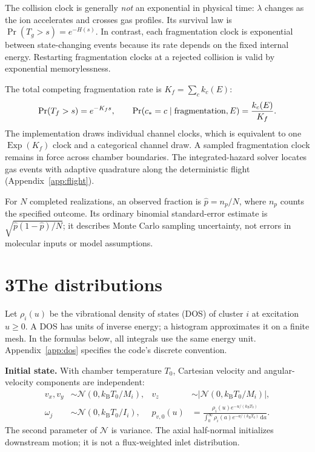 \documentclass[10pt,a4paper]{article}
\newcommand{\dd}{\,\mathrm d}
\newcommand{\kb}{k_{\mathrm B}}
\newcommand{\Normal}{\mathcal N}
\newcommand{\Exp}{\operatorname{Exp}}
\newcommand{\overview}[2]{\section*{#1\quad #2}\addcontentsline{toc}{section}{#1 #2}}
\begin{document}
The collision clock is generally \emph{not} an exponential in physical time:
$\lambda$ changes as the ion accelerates and crosses gas profiles. Its survival
law is $\Pr(T_g>s)=e^{-H(s)}$. In contrast, each fragmentation clock is exponential
between state-changing events because its rate depends on the fixed internal
energy. Restarting fragmentation clocks at a rejected collision is valid by
exponential memorylessness.

The total competing fragmentation rate is $K_f=\sum_c k_c(E)$:
\[
 \Pr(T_f>s)=e^{-K_fs},\qquad
 \Pr(c_*=c\mid\hbox{fragmentation},E)=\frac{k_c(E)}{K_f}.
\]
The implementation draws individual channel clocks, which is equivalent to
one $\Exp(K_f)$ clock and a categorical channel draw. A sampled fragmentation
clock remains in force across chamber boundaries. The integrated-hazard solver
locates gas events with adaptive quadrature along the deterministic flight
(Appendix~\ref{app:flight}).

For $N$ completed realizations, an observed fraction is $\widehat p=n_p/N$,
where $n_p$ counts the specified outcome. Its ordinary binomial standard-error
estimate is $\sqrt{\widehat p(1-\widehat p)/N}$; it describes Monte Carlo sampling
uncertainty, not errors in molecular inputs or model assumptions.

\clearpage
\overview{3}{The distributions}
Let $\rho_i(u)$ be the vibrational density of states (DOS) of cluster $i$ at
excitation $u\geq0$. A DOS has units of inverse energy; a histogram approximates
it on a finite mesh. In the formulas below, all integrals use the same energy
unit. Appendix~\ref{app:dos} specifies the code's discrete convention.

\textbf{Initial state.} With chamber temperature $T_0$, Cartesian velocity and
angular-velocity components are independent:
\begin{align}
 v_x,v_y&\sim\Normal(0,\kb T_0/M_i),&
 v_z&\sim|\Normal(0,\kb T_0/M_i)|,\label{eq:initv}\\
 \omega_j&\sim\Normal(0,\kb T_0/I_i),&
 p_{v,0}(u)&=\frac{\rho_i(u)e^{-u/(\kb T_0)}}
 {\int_0^\infty\rho_i(a)e^{-a/(\kb T_0)}\dd a}.\label{eq:initomega}
\end{align}
The second parameter of $\Normal$ is variance. The axial half-normal initializes
downstream motion; it is not a flux-weighted inlet distribution.
\end{document}
